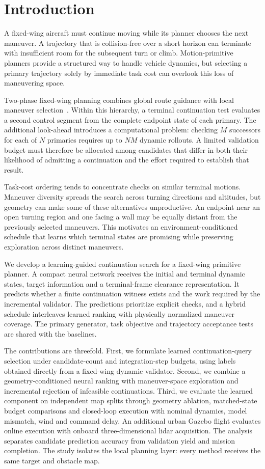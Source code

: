\section{Introduction}
A fixed-wing aircraft must continue moving while its planner chooses the next maneuver. A trajectory that is collision-free over a short horizon can terminate with insufficient room for the subsequent turn or climb. Motion-primitive planners provide a structured way to handle vehicle dynamics, but selecting a primary trajectory solely by immediate task cost can overlook this loss of maneuvering space.

Two-phase fixed-wing planning combines global route guidance with local maneuver selection~\cite{tan2022twophase,tan2026twophase}. Within this hierarchy, a terminal continuation test evaluates a second control segment from the complete endpoint state of each primary. The additional look-ahead introduces a computational problem: checking $M$ successors for each of $N$ primaries requires up to $NM$ dynamic rollouts. A limited validation budget must therefore be allocated among candidates that differ in both their likelihood of admitting a continuation and the effort required to establish that result.

Task-cost ordering tends to concentrate checks on similar terminal motions. Maneuver diversity spreads the search across turning directions and altitudes, but geometry can make some of these alternatives unproductive. An endpoint near an open turning region and one facing a wall may be equally distant from the previously selected maneuvers. This motivates an environment-conditioned schedule that learns which terminal states are promising while preserving exploration across distinct maneuvers.

We develop a learning-guided continuation search for a fixed-wing primitive planner. A compact neural network receives the initial and terminal dynamic states, target information and a terminal-frame clearance representation. It predicts whether a finite continuation witness exists and the work required by the incremental validator. The predictions prioritize explicit checks, and a hybrid schedule interleaves learned ranking with physically normalized maneuver coverage. The primary generator, task objective and trajectory acceptance tests are shared with the baselines.

The contributions are threefold. First, we formulate learned continuation-query selection under candidate-count and integration-step budgets, using labels obtained directly from a fixed-wing dynamic validator. Second, we combine a geometry-conditioned neural ranking with maneuver-space exploration and incremental rejection of infeasible continuations. Third, we evaluate the learned component on independent map splits through geometry ablation, matched-state budget comparisons and closed-loop execution with nominal dynamics, model mismatch, wind and command delay. An additional urban Gazebo flight evaluates online execution with onboard three-dimensional lidar acquisition. The analysis separates candidate prediction accuracy from validation yield and mission completion. The study isolates the local planning layer: every method receives the same target and obstacle map.

